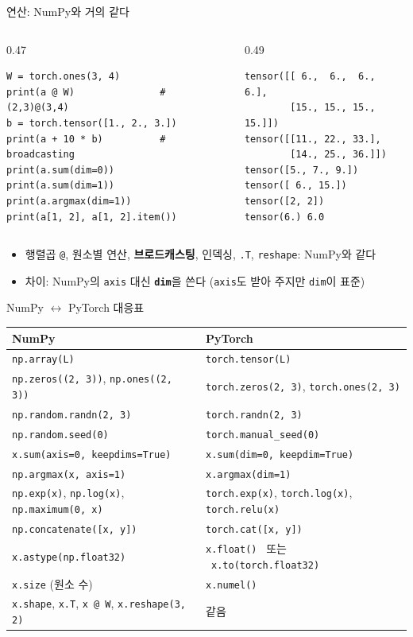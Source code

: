 \documentclass[aspectratio=169,11pt]{beamer}
\newcommand{\code}[1]{\texttt{#1}}
\begin{document}
\begin{frame}[fragile]{연산: NumPy와 거의 같다}
\begin{columns}[T,onlytextwidth]
\begin{column}{0.47\textwidth}
\begin{lstlisting}
W = torch.ones(3, 4)
print(a @ W)               # (2,3)@(3,4)
b = torch.tensor([1., 2., 3.])
print(a + 10 * b)          # broadcasting
print(a.sum(dim=0))
print(a.sum(dim=1))
print(a.argmax(dim=1))
print(a[1, 2], a[1, 2].item())
\end{lstlisting}
\end{column}
\begin{column}{0.49\textwidth}
\begin{lstlisting}[style=outstyle]
tensor([[ 6.,  6.,  6.,  6.],
        [15., 15., 15., 15.]])
tensor([[11., 22., 33.],
        [14., 25., 36.]])
tensor([5., 7., 9.])
tensor([ 6., 15.])
tensor([2, 2])
tensor(6.) 6.0
\end{lstlisting}
\end{column}
\end{columns}
\vskip2mm
\begin{itemize}
\item 행렬곱 \code{@}, 원소별 연산, \textbf{브로드캐스팅}, 인덱싱, \code{.T}, \code{reshape}: NumPy와 같다
\item 차이: NumPy의 \code{axis} 대신 \textbf{\code{dim}}을 쓴다 (\code{axis}도 받아 주지만 \code{dim}이 표준)
\end{itemize}
\end{frame}

\begin{frame}{NumPy $\leftrightarrow$ PyTorch 대응표}
\centering
\footnotesize
\renewcommand{\arraystretch}{1.2}
\begin{tabular}{ll}
\toprule
\textbf{NumPy} & \textbf{PyTorch} \\
\midrule
\code{np.array(L)} & \code{torch.tensor(L)} \\
\code{np.zeros((2, 3))}, \code{np.ones((2, 3))} & \code{torch.zeros(2, 3)}, \code{torch.ones(2, 3)} \\
\code{np.random.randn(2, 3)} & \code{torch.randn(2, 3)} \\
\code{np.random.seed(0)} & \code{torch.manual\_seed(0)} \\
\code{x.sum(axis=0, keepdims=True)} & \code{x.sum(dim=0, keepdim=True)} \\
\code{np.argmax(x, axis=1)} & \code{x.argmax(dim=1)} \\
\code{np.exp(x)}, \code{np.log(x)}, \code{np.maximum(0, x)} & \code{torch.exp(x)}, \code{torch.log(x)}, \code{torch.relu(x)} \\
\code{np.concatenate([x, y])} & \code{torch.cat([x, y])} \\
\code{x.astype(np.float32)} & \code{x.float()} \ 또는 \ \code{x.to(torch.float32)} \\
\code{x.size} (원소 수) & \code{x.numel()} \\
\code{x.shape}, \code{x.T}, \code{x @ W}, \code{x.reshape(3, 2)} & 같음 \\
\bottomrule
\end{tabular}
\end{frame}
\end{document}
